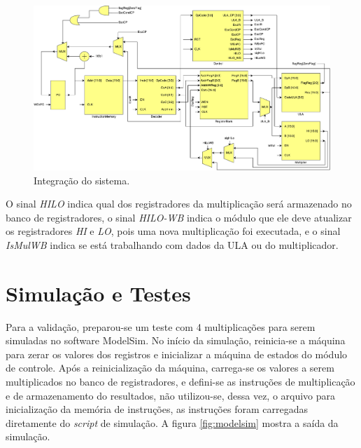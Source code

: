 \documentclass[11pt,a4paper,titlepage]{article}
\begin{document}
\begin{figure}[!h]
\centering
\includegraphics[scale=0.4]{images/Microprocessor.pdf}
\caption{Integração do sistema.}
\label{fig:impl}
\end{figure}

O sinal \textit{HILO} indica qual dos registradores da multiplicação será armazenado no banco de registradores, o sinal \textit{HILO-WB} indica o módulo que ele deve atualizar os registradores \textit{HI} e \textit{LO}, pois uma nova multiplicação foi executada, e o sinal \textit{IsMulWB} indica se está trabalhando com dados da ULA ou do multiplicador.

\section{Simulação e Testes}

Para a validação, preparou-se um teste com 4 multiplicações para serem simuladas no software ModelSim. No início da simulação, reinicia-se a máquina para zerar os valores dos registros e inicializar a máquina de estados do módulo de controle. Após a reinicialização da máquina, carrega-se os valores a serem multiplicados no banco de registradores, e defini-se as instruções de multiplicação e de armazenamento do resultados, não utilizou-se, dessa vez, o arquivo para inicialização da memória de instruções, as instruções foram carregadas diretamente do \textit{script} de simulação. A figura \ref{fig:modelsim} mostra a saída da simulação. 
\end{document}
